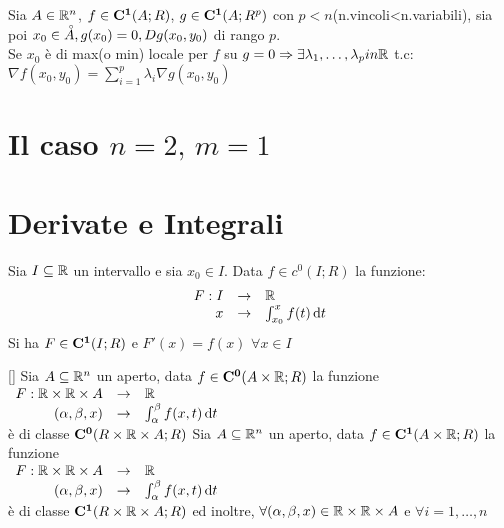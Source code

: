 Sia $A\in \mathbb{R}^n$, $f\in \mathbf{C^{1}}(A;R)$, $g\in \mathbf{C^{1}}(A;R^p)$ con $p<n$(n.vincoli<n.variabili), sia poi $x_0\in\accentset{\circ}{A}, g(x_0)=0, Dg (x_0,y_0)$ di rango $p$.\\
Se $x_0$ è di max(o min) locale per $f$ su $g=0\Rightarrow\exists \lambda_1,\ldots,\lambda_p in \mathbb{R}$ t.c: $\nabla f(x_0,y_0) = \sum\limits_{i=1}^{p}\lambda_i\nabla g(x_0,y_0)$\\
\newpage
\section{Il caso \texorpdfstring{$n=2,\,m=1$}{n=2, m=1}}
\newpage
\section{Derivate e Integrali}
\begin{proposition}
	\label{teo:fondament_calcolo_integ}
	Sia $I\subseteq \mathbb{R}$ un intervallo e sia $x_0\in I$. Data $f\in c^0(I;R)$ la funzione:
	\[\begin{array}{rcl} F: I & \to & \mathbb{R} \\ x & \to & \int_{x_0}^{x}f(t)\,\mathrm{d}{t} \end{array}\]
	Si ha $F\in \mathbf{C^{1}}(I;R)$ e $F'(x)=f(x)$ $\forall x \in I$
\end{proposition}[]
\proposition
Sia $A\subseteq \mathbb{R}^n$ un aperto, data $f\in \mathbf{C^{0}}(A\times \mathbb{R};R)$ la funzione \\
$\begin{array}{rcl} F: \mathbb{R}\times \mathbb{R}\times A & \to & \mathbb{R} \\ (\alpha,\beta,x) & \to & \int_{\alpha}^{\beta}f(x,t)\,\mathrm{d}{t} \end{array}$\\
è di classe $\mathbf{C^{0}}(R\times \mathbb{R}\times A;R)$
\proposition
Sia $A\subseteq \mathbb{R}^n$ un aperto, data $f\in \mathbf{C^{1}}(A\times \mathbb{R};R)$ la funzione \\
$\begin{array}{rcl} F: \mathbb{R}\times \mathbb{R}\times A & \to & \mathbb{R} \\ (\alpha,\beta,x) & \to & \int_{\alpha}^{\beta}f(x,t)\,\mathrm{d}{t} \end{array}$\\
è di classe $\mathbf{C^{1}}(R\times \mathbb{R}\times A;R)$ ed inoltre, $\forall (\alpha,\beta,x)\in \mathbb{R}\times \mathbb{R}\times A$ e $\forall i=1,\ldots,n$\\
